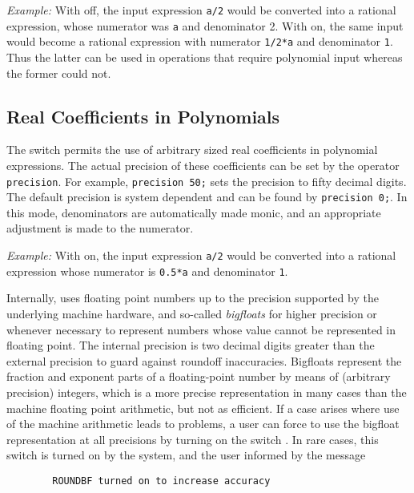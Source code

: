 \textit{Example:} With  off, the input expression \texttt{a/2}
would be converted into a rational expression, whose numerator was \texttt{a}
and denominator 2.  With  on, the same input would become a
rational expression with numerator \texttt{1/2*a} and denominator \texttt{1}.
Thus the latter can be used in operations that require polynomial input
whereas the former could not.

\subsection{Real Coefficients in Polynomials}
\hypertarget{switch:ROUNDED}{}
\hypertarget{switch:ROUNDBF}{}
\hypertarget{operator:PRECISION}{}
The switch  permits the use of arbitrary
sized real coefficients in polynomial expressions.  The actual precision
of these coefficients can be set by the operator \texttt{precision}.
 For example, \texttt{precision 50;} sets the precision to
fifty decimal digits.  The default precision is system dependent and can
be found by \texttt{precision 0;}.  In this mode, denominators are
automatically made monic, and an appropriate adjustment is made to the
numerator.

\textit{Example:} With  on, the input expression \texttt{a/2} would
be converted into a rational expression whose numerator is \texttt{0.5*a} and
denominator \texttt{1}.

Internally, {\REDUCE} uses floating point numbers up to the precision
supported by the underlying machine hardware, and so-called \emph{bigfloats}
for higher precision or whenever necessary to represent numbers
whose value cannot be represented in floating point.  The internal
precision is two decimal digits greater than the external precision to
guard against roundoff inaccuracies.  Bigfloats represent the fraction and
exponent parts of a floating-point number by means of (arbitrary
precision) integers, which is a more precise representation in many cases
than the machine floating point arithmetic, but not as efficient.  If a
case arises where use of the machine arithmetic leads to problems, a user
can force {\REDUCE} to use the bigfloat representation at all precisions by
turning on the switch .  In rare cases,
this switch is turned on by the system, and the user informed by the
message
\begin{verbatim}
        ROUNDBF turned on to increase accuracy
\end{verbatim}

